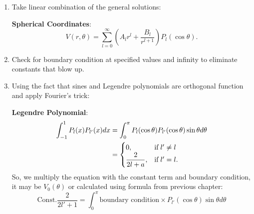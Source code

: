 \documentclass{report}
\begin{document}
\begin{enumerate}
    
    \item Take linear combination of the general solutions: 
    
    \textbf{Spherical Coordinates}: 
    \begin{equation}
        V(r,\theta) = \sum_{l=0}^\infty \left( A_lr^l + \frac{B_l}{r^{l+1}} \right) P_l (\cos{\theta}). 
    \end{equation}
    
    \item Check for boundary condition at specified values and infinity to eliminate constants that blow up. 
    
    \item Using the fact that sines and Legendre polynomials are orthogonal function and apply Fourier's trick: 
    
    \textbf{Legendre Polynomial}: 
    \begin{align}
        \int_{-1}^1 P_l(x)P_{l'}(x)dx &= \int_0^{\pi} P_l(\cos{\theta})P_{l'}(\cos{\theta})\sin{\theta}d\theta\\
        & = 
        \begin{cases}
        \displaystyle 0, & \text{if\;} l' \neq l\\
        \displaystyle \frac{2}{2l+a}, & \text{if\;} l' = l.
        \end{cases}
    \end{align}
    So, we multiply the equation with the constant term and boundary condition, it may be $V_0(\theta)$ or calculated using formula from previous chapter: 
    \begin{equation}
        \text{Const.} \frac{2}{2l' + 1} = \int_0^{\pi} \text{boundary condition} \times P_{l'}(\cos{\theta})\sin{\theta}d\theta
    \end{equation}
\end{enumerate}

    
\end{document}
